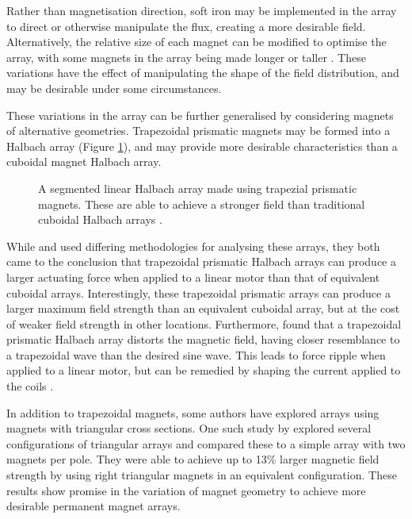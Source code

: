 Rather than magnetisation direction, soft iron may be implemented in the array \cite{Forbes2021,Xu2018} to direct or otherwise manipulate the flux, creating a more desirable field. Alternatively, the relative size of each magnet can be modified to optimise the array, with some magnets in the array being made longer or taller \cite{Shen2013,Shen2013a}. These variations have the effect of manipulating the shape of the field distribution, and may be desirable under some circumstances.

These variations in the array can be further generalised by considering magnets of alternative geometries. Trapezoidal prismatic magnets may be formed into a Halbach array (Figure \ref{fig:trapezoidalPrismaticHalbach}), and may provide more desirable characteristics than a cuboidal magnet Halbach array.
\begin{figure}
    \centering
    
    \caption{A segmented linear Halbach array made using trapezial prismatic magnets. These are able to achieve a stronger field than traditional cuboidal Halbach arrays \cite{Lee2004,Meessen2008}.}
    \label{fig:trapezoidalPrismaticHalbach}
\end{figure}
While \textcite{Lee2004} and \textcite{Meessen2008} used differing methodologies for analysing these arrays, they both came to the conclusion that trapezoidal prismatic Halbach arrays can produce a larger actuating force when applied to a linear motor than that of equivalent cuboidal arrays. Interestingly, these trapezoidal prismatic arrays can produce a larger maximum field strength than an equivalent cuboidal array, but at the cost of weaker field strength in other locations. Furthermore, \textcite{Lee2006} found that a trapezoidal prismatic Halbach array distorts the magnetic field, having closer resemblance to a trapezoidal wave than the desired sine wave. This leads to force ripple when applied to a linear motor, but can be remedied by shaping the current applied to the coils \cite{Lee2006}.

In addition to trapezoidal magnets, some authors have explored arrays using magnets with triangular cross sections. One such study by \textcite{Majernik2019} explored several configurations of triangular arrays and compared these to a simple array with two magnets per pole. They were able to achieve up to 13\% larger magnetic field strength by using right triangular magnets in an equivalent configuration. These results show promise in the variation of magnet geometry to achieve more desirable permanent magnet arrays.

